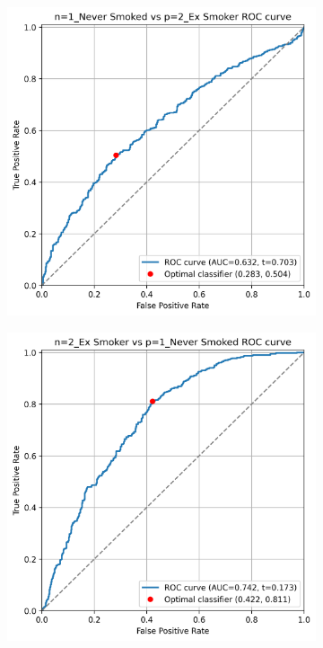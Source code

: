 \documentclass[draft]{article} %
\begin{document}
\begin{figure}[p]
    \begin{subfigure}{0.46\linewidth}
        \centering
        \includegraphics[width=\linewidth]{cohort2/test_1v2_roc.png}
    \end{subfigure}
    \hspace{4mm}
    \begin{subfigure}{0.46\linewidth}
        \centering
        \includegraphics[width=\linewidth]{cohort2/test_2v1_roc.png}

\end{subfigure}
\end{figure}
\end{document}
